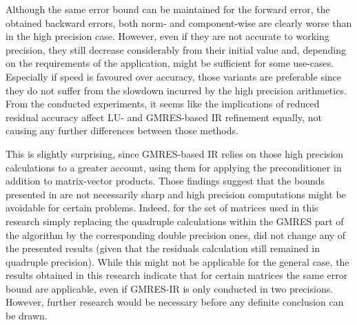 Although the same error bound can be maintained for the forward error, the obtained backward errors, both norm- and component-wise are clearly worse than in the high precision case. However, even if they are not accurate to working precision, they still decrease considerably from their initial value and, depending on the requirements of the application, might be sufficient for some use-cases. Especially if speed is favoured over accuracy, those variants are preferable since they do not suffer from the slowdown incurred by the high precision arithmetics. From the conducted experiments, it seems like the implications of reduced residual accuracy affect LU- and GMRES-based IR refinement equally, not causing any further differences between those methods.

This is slightly surprising, since GMRES-based IR relies on those high precision calculations to a greater account, using them for applying the preconditioner in addition to matrix-vector products. Those findings suggest that the bounds presented in \cite{carson_new_2017} are not necessarily sharp and high precision computations might be avoidable for certain problems. Indeed, for the set of matrices used in this research simply replacing the quadruple calculations within the GMRES part of the algorithm by the corresponding double precision ones, did not change any of the presented results (given that the residuals calculation still remained in quadruple precision). While this might not be applicable for the general case, the results obtained in this research indicate that for certain matrices the same error bound are applicable, even if GMRES-IR is only conducted in two precisions. However, further research would be necessary before any definite conclusion can be drawn. 
